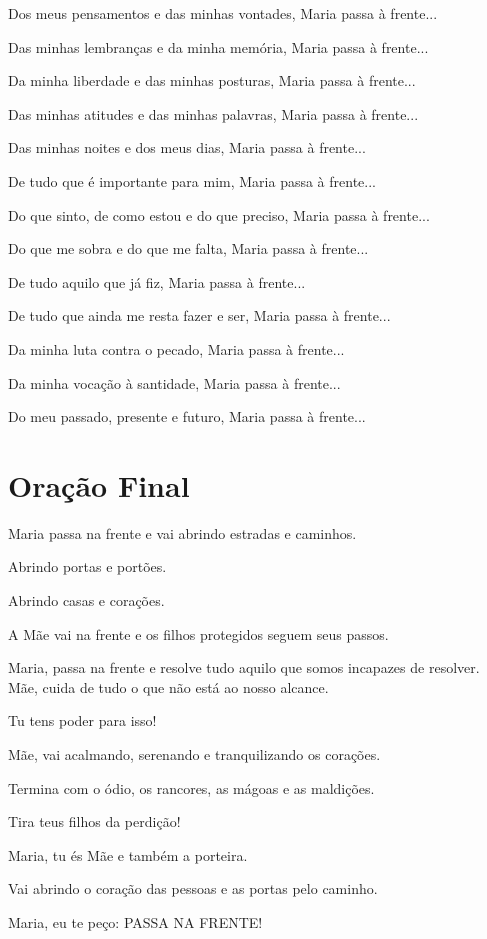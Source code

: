 \documentclass[a4paper,14pt]{extarticle} \usepackage[utf8]{inputenc}
\begin{document}
Dos meus pensamentos e das minhas vontades, Maria passa à frente...

Das minhas lembranças e da minha memória, Maria passa à frente...

Da minha liberdade e das minhas posturas, Maria passa à frente...

Das minhas atitudes e das minhas palavras, Maria passa à frente...

Das minhas noites e dos meus dias, Maria passa à frente...

De tudo que é importante para mim, Maria passa à frente...

Do que sinto, de como estou e do que preciso, Maria passa à frente...

Do que me sobra e do que me falta, Maria passa à frente...

De tudo aquilo que já fiz, Maria passa à frente...

De tudo que ainda me resta fazer e ser, Maria passa à frente...

Da minha luta contra o pecado, Maria passa à frente...

Da minha vocação à santidade, Maria passa à frente...

Do meu passado, presente e futuro, Maria passa à frente...

\section{Oração Final} \label{oracao-final}
Maria passa na frente e vai abrindo estradas e caminhos.

Abrindo portas e portões.

Abrindo casas e corações.

A Mãe vai na frente e os filhos protegidos seguem seus passos.

Maria, passa na frente e resolve tudo aquilo que somos incapazes de resolver.
Mãe, cuida de tudo o que não está ao nosso alcance.

Tu tens poder para isso!

Mãe, vai acalmando, serenando e tranquilizando os corações.

Termina com o ódio, os rancores, as mágoas e as maldições.

Tira teus filhos da perdição!

Maria, tu és Mãe e também a porteira.

Vai abrindo o coração das pessoas e as portas pelo caminho.

Maria, eu te peço: PASSA NA FRENTE!
\end{document}
